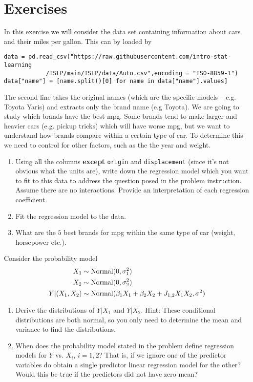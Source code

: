 \section{Exercises}
\begin{exercise}
In this exercise we will consider the data set containing information about cars and their miles per gallon. This can by loaded by 
\begin{Verbatim}
data = pd.read_csv("https://raw.githubusercontent.com/intro-stat-learning
			/ISLP/main/ISLP/data/Auto.csv",encoding = "ISO-8859-1")
data["name"] = [name.split()[0] for name in data["name"].values]
\end{Verbatim}
The second line takes the original names (which are the specific models -- e.g. Toyota Yaris) and extracts only the brand name (e.g  Toyota). We are going to study which brands have the best mpg. Some brands tend to make larger and heavier cars (e.g. pickup tricks) which will have worse mpg, but we want to understand how brands compare within a certain type of car. To determine this we need to control for other factors, such as the the year and weight. 
\begin{enumerate}[label=(\alph*)]
\item Using all the columns {\bf except} \verb!origin! and \verb!displacement! (since it's not obvious what the units are), write down the regression model which you want to fit to this data to address the question posed in the problem instruction. Assume there are no interactions. Provide an interpretation of each regression coefficient.  
\item Fit the regression model to the data. 
\item What are the $5$ best brands for mpg within the same type of car (weight, horsepower etc.). 
\end{enumerate}


\end{exercise}
\begin{exercise}
Consider the probability model 
\begin{align*}
X_1 &\sim {\rm Normal}(0,\sigma_1^2)\\
X_2 &\sim {\rm Normal}(0,\sigma_2^2)\\
Y|(X_1,X_2) &\sim {\rm Normal}(\beta_1 X_1 + \beta_2 X_2 + J_{1,2}X_1X_2,\sigma^2)
\end{align*}
\begin{enumerate}[label=(\alph*)]
\item Derive the distributions of $Y|X_1$ and $Y|X_2$. Hint: These conditional distributions are both normal, so you only need to determine the mean and variance to find the distributions. 
\item When does the probability model stated in the problem define regression models for $Y$ vs. $X_i$, $i=1,2$? That is, if we ignore one of the predictor variables do obtain a single predictor linear regression model for the other?Would this be true if the predictors did not have zero mean?
\end{enumerate}

\end{exercise}


